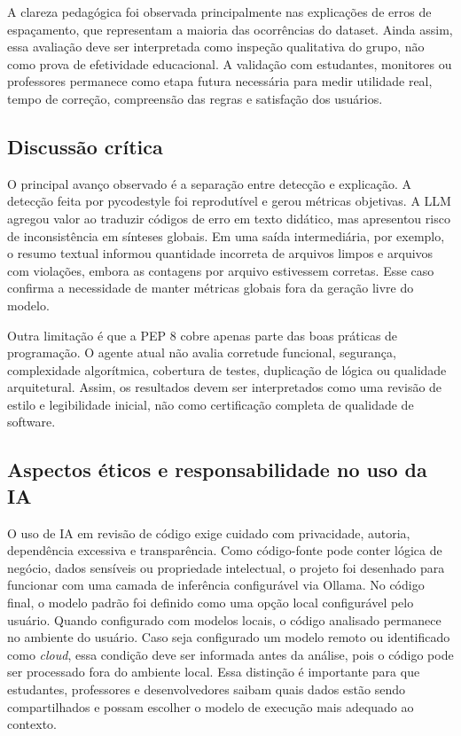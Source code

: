 \documentclass[12pt]{article}
\begin{document}
A clareza pedagógica foi observada principalmente nas explicações de erros de
espaçamento, que representam a maioria das ocorrências do dataset. Ainda assim,
essa avaliação deve ser interpretada como inspeção qualitativa do grupo, não
como prova de efetividade educacional. A validação com estudantes, monitores ou
professores permanece como etapa futura necessária para medir utilidade real,
tempo de correção, compreensão das regras e satisfação dos usuários.

\subsection{Discussão crítica}

O principal avanço observado é a separação entre detecção e explicação. A
detecção feita por pycodestyle foi reprodutível e gerou métricas
objetivas. A LLM agregou valor ao traduzir códigos de erro em texto didático,
mas apresentou risco de inconsistência em sínteses globais. Em uma saída
intermediária, por exemplo, o resumo textual informou quantidade incorreta de
arquivos limpos e arquivos com violações, embora as contagens por arquivo
estivessem corretas. Esse caso confirma a necessidade de manter métricas globais
fora da geração livre do modelo.

Outra limitação é que a PEP 8 cobre apenas parte das boas práticas de
programação. O agente atual não avalia corretude funcional, segurança,
complexidade algorítmica, cobertura de testes, duplicação de lógica ou qualidade
arquitetural. Assim, os resultados devem ser interpretados como uma revisão de
estilo e legibilidade inicial, não como certificação completa de qualidade de
software.

\subsection{Aspectos éticos e responsabilidade no uso da IA}

O uso de IA em revisão de código exige cuidado com privacidade, autoria,
dependência excessiva e transparência. Como código-fonte pode conter lógica de
negócio, dados sensíveis ou propriedade intelectual, o projeto foi desenhado
para funcionar com uma camada de inferência configurável via Ollama. No código
final, o modelo padrão foi definido como uma opção local configurável pelo
usuário. Quando configurado com modelos locais, o código analisado permanece no
ambiente do usuário. Caso seja configurado um modelo remoto ou identificado como
\textit{cloud}, essa condição deve ser informada antes da análise, pois o código
pode ser processado fora do ambiente local. Essa distinção é importante para que
estudantes, professores e desenvolvedores saibam quais dados estão sendo
compartilhados e possam escolher o modelo de execução mais adequado ao contexto.
\end{document}

